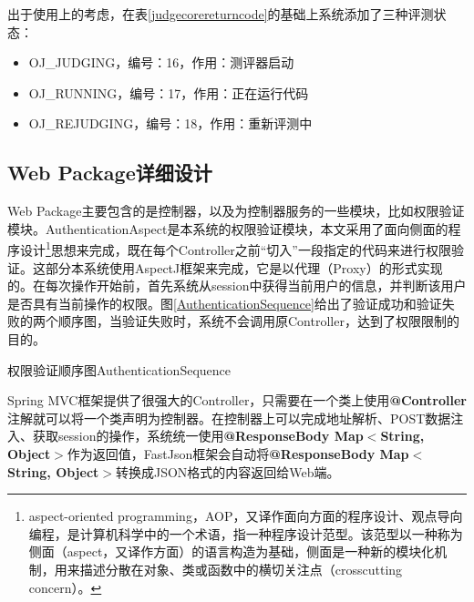 出于使用上的考虑，在表\ref{judgecorereturncode}的基础上系统添加了三种评测状态：
\begin{itemize}
	\item OJ\_JUDGING，编号：16，作用：测评器启动
	\item OJ\_RUNNING，编号：17，作用：正在运行代码
	\item OJ\_REJUDGING，编号：18，作用：重新评测中
\end{itemize}

\subsection{Web Package详细设计}
Web Package主要包含的是控制器，以及为控制器服务的一些模块，比如权限验证模块。AuthenticationAspect是本系统的权限验证模块，本文采用了面向侧面的程序设计\footnote{aspect-oriented programming，AOP，又译作面向方面的程序设计、观点导向编程，是计算机科学中的一个术语，指一种程序设计范型。该范型以一种称为侧面（aspect，又译作方面）的语言构造为基础，侧面是一种新的模块化机制，用来描述分散在对象、类或函数中的横切关注点（crosscutting concern）。}思想来完成，既在每个Controller之前``切入''一段指定的代码来进行权限验证。这部分本系统使用AspectJ框架来完成，它是以代理（Proxy）的形式实现的。在每次操作开始前，首先系统从session中获得当前用户的信息，并判断该用户是否具有当前操作的权限。图\ref{AuthenticationSequence}给出了验证成功和验证失败的两个顺序图，当验证失败时，系统不会调用原Controller，达到了权限限制的目的。

\begin{pics}[htbp]{权限验证顺序图}{AuthenticationSequence}
\end{pics}

Spring MVC框架提供了很强大的Controller，只需要在一个类上使用\textbf{@Controller}注解就可以将一个类声明为控制器。在控制器上可以完成地址解析、POST数据注入、获取session的操作，系统统一使用\textbf{@ResponseBody Map$<$String, Object$>$}作为返回值，FastJson框架会自动将\textbf{@ResponseBody Map$<$String, Object$>$}转换成JSON格式的内容返回给Web端。

